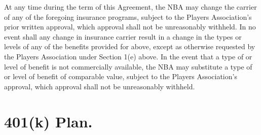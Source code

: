 \documentclass[
]{book}
\begin{document}
At any time during the term of this Agreement, the NBA may change the carrier of any of the foregoing insurance programs, subject to the Players Association's prior written approval, which approval shall not be unreasonably withheld. In no event shall any change in insurance carrier result in a change in the types or levels of any of the benefits provided for above, except as otherwise requested by the Players Association under Section 1(e) above. In the event that a type of or level of benefit is not commercially available, the NBA may substitute a type of or level of benefit of comparable value, subject to the Players Association's approval, which approval shall not be unreasonably withheld.

\hypertarget{k-plan.}{%
\section{401(k) Plan.}\label{k-plan.}}
\end{document}
